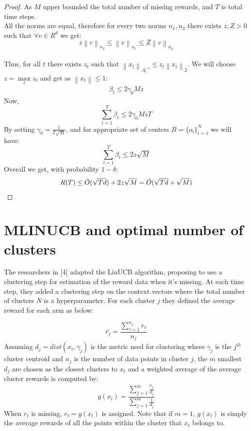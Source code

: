 \documentclass{article}
\newcommand{\norm}[1]{\left\lVert#1\right\rVert}
\begin{document}
\begin{proof}
As $M$ upper bounded the total number of missing rewards, and $T$ is total time steps.\\
All the norms are equal, therefore for every two norms $n_1, n_2$ there exists $z,Z > 0$ such that $\forall v \in R^d$ we get:
$$z \norm{v}_{n_2} \leq \norm{v}_{n_1}  \leq Z \norm{v}_{n_2}$$\\
Thus, for all $t$ there exists $z_t$ such that $\norm{x_t}_{A_t^{-1}} \leq z_t \norm{x_t}_2$. We will choose $z = \max\limits_{t} z_t$ and get as $\norm{x_t} \leq 1$:
\begin{equation}
    \begin{split}
        \beta_t \leq 2\gamma_0 M z
    \end{split}
\end{equation}
Now,
\begin{equation}
  \sum_{t=1}^T \beta_t \leq 2 \gamma_0 MzT
\end{equation}
By setting $\gamma_0 = \frac{1}{T\sqrt{M}}$, and for appropriate set of centers $B= \{o_i\}_{i=1}^N$ we will have: 
\begin{equation}
  \sum_{t=1}^T \beta_t \leq 2z\sqrt{M}
\end{equation}
Overall we get, with probability $1-\delta$:
\[R(T) \leq \Tilde{O}(\sqrt{Td}) +  2z\sqrt{M}  = \Tilde{O}(\sqrt{Td}+\sqrt{M})\]
\end{proof}

\section{MLINUCB and optimal number of clusters}

The researchers in [4] adapted the LinUCB algorithm, proposing to use a clustering step for estimation of the reward data when it's missing. At each time step, they added a clustering step on the context vectors where the total number of clusters $N$ is a hyperparameter. For each cluster $j$ they defined the average reward for each arm as below:

\[\bar{r_j} = \frac{\sum_{\tau=1}^{n_j} r_\tau}{n_j}\]
Assuming $d_j = dist(x_t, \gamma_j)$ is the metric used for clustering where $\gamma_j$ is the $j^{th}$ cluster centroid and $n_j$ is the number of data points in cluster $j$, the $m$ smallest $d_j$ are chosen as the closest clusters to $x_t$ and a weighted average of the average cluster rewards is computed by:\\

\[g(x_t) = \frac{\sum_{j=1}^m \frac{\bar{r_j}}{d_j}}{\sum_{j=1}^m \frac{1}{d_j}}\]
When $r_t$ is missing, $r_t = g(x_t)$ is assigned. Note that if $m = 1$, $g(x_t)$ is simply the average rewards of all the points within the cluster that $x_t$ belongs to.\\
\end{document}
